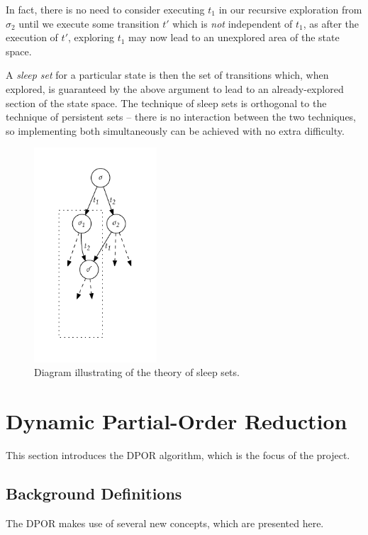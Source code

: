 \documentclass[12pt,a4paper,twoside,openright]{report}
\begin{document}
In fact, there is no need to consider executing
$t_1$ in our recursive exploration from $\sigma_2$
until we execute some transition $t'$ which is
\emph{not} independent of $t_1$, as after
the execution of $t'$, exploring $t_1$ may
now lead to an unexplored area of the state space.

A \emph{sleep set} for a particular state
is then the set of transitions which, when
explored, is guaranteed by the above
argument to lead to an already-explored
section of the state space\footnotemark.
The technique of
sleep sets is orthogonal to the technique
of persistent sets -- there is no interaction
between the two techniques, so implementing
both simultaneously can be achieved with
no extra difficulty.

\begin{figure}
	\centering
	\includegraphics[height=8cm]{sleep}
	\caption{Diagram illustrating of the theory
		of sleep sets.}
	\label{fig:sleep}
\end{figure}

\section{Dynamic Partial-Order Reduction}
\label{sec:dpor-prep}
This section introduces the DPOR algorithm,
which is the focus of the project.

\subsection{Background Definitions}
The DPOR makes use of several new concepts,
which are presented here.
\end{document}
